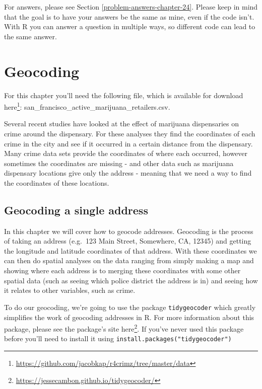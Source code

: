\documentclass[
]{krantz}
\renewcommand{\href}[2]{#2\footnote{\url{#1}}}
\begin{document}
For answers, please see Section \ref{problem-answers-chapter-24}. Please keep in mind that the goal is to have your answers be the same as mine, even if the code isn't. With R you can answer a question in multiple ways, so different code can lead to the same answer.

\hypertarget{geocoding}{%
\chapter{Geocoding}\label{geocoding}}

For this chapter you'll need the following file, which is available for download \href{https://github.com/jacobkap/r4crimz/tree/master/data}{here}: san\_francisco\_active\_marijuana\_retailers.csv.

Several recent studies have looked at the effect of marijuana dispensaries on crime around the dispensary. For these analyses they find the coordinates of each crime in the city and see if it occurred in a certain distance from the dispensary. Many crime data sets provide the coordinates of where each occurred, however sometimes the coordinates are missing - and other data such as marijuana dispensary locations give only the address - meaning that we need a way to find the coordinates of these locations.

\hypertarget{geocoding-a-single-address}{%
\section{Geocoding a single address}\label{geocoding-a-single-address}}

In this chapter we will cover how to geocode addresses. Geocoding is the process of taking an address (e.g.~123 Main Street, Somewhere, CA, 12345) and getting the longitude and latitude coordinates of that address. With these coordinates we can then do spatial analyses on the data ranging from simply making a map and showing where each address is to merging these coordinates with some other spatial data (such as seeing which police district the address is in) and seeing how it relates to other variables, such as crime.

To do our geocoding, we're going to use the package \texttt{tidygeocoder} which greatly simplifies the work of geocoding addresses in R. For more information about this package, please see the package's site \href{https://jessecambon.github.io/tidygeocoder/}{here}. If you've never used this package before you'll need to install it using \texttt{install.packages("tidygeocoder")}
\end{document}
